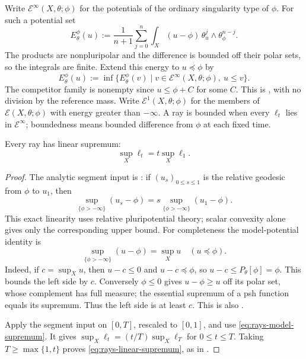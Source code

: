 \begin{definition}
\label{def:rays-relative-energy}
Write $\mathcal E^\infty(X,\theta;\phi)$ for the potentials of
the ordinary singularity type of $\phi$.  For such a potential set
\[
 E_\theta^\phi(u)
 :=\frac1{n+1}\sum_{j=0}^n
       \int_X(u-\phi)\,\theta_u^j\wedge\theta_\phi^{n-j}.
\tag{52.3a}\label{eq:rays-relative-energy}
\]
The products are nonpluripolar and the difference is bounded off their
polar sets, so the integrals are finite.  Extend this energy to
$u\preceq\phi$ by
\[
 E_\theta^\phi(u)
 :=\inf\{E_\theta^\phi(v)\mid v\in\mathcal E^\infty(X,\theta;\phi),\ u\leq v\}.
\]
The competitor family is nonempty since $u\leq\phi+C$ for some $C$.
This is \cite[Definition~3.1.6]{XiaBook}, with no division by the
reference mass.  Write $\mathcal E^1(X,\theta;\phi)$ for the members
of $\mathcal E(X,\theta;\phi)$ with energy greater than $-\infty$.
A ray is bounded when every $\ell_t$ lies in $\mathcal E^\infty$;
boundedness means bounded difference from $\phi$ at each fixed time.
\end{definition}

\begin{lemma}\label{lem:rays-linear-supremum}
Every ray has linear supremum:
\[
                    \sup_X\ell_t=t\sup_X\ell_1.
\tag{52.4}\label{eq:rays-linear-supremum}
\]
\end{lemma}

\begin{proof}
The analytic segment input is \cite[Proposition~4.2.2]{XiaBook}:
if $(u_s)_{0\leq s\leq1}$ is the relative geodesic from $\phi$ to $u_1$,
then
\[
 \sup_{\{\phi>-\infty\}}(u_s-\phi)
 =s\sup_{\{\phi>-\infty\}}(u_1-\phi).
\]
This exact linearity uses relative pluripotential theory; scalar
convexity alone gives only the corresponding upper bound.
For completeness the model-potential identity is
\[
 \sup_{\{\phi>-\infty\}}(u-\phi)=\sup_Xu
\quad(u\preceq\phi).
\tag{52.5}\label{eq:rays-model-supremum}
\]
Indeed, if $c=\sup_Xu$, then $u-c\leq0$ and $u-c\preceq\phi$, so
$u-c\leq P_\theta[\phi]=\phi$.  This bounds the left side by $c$.
Conversely $\phi\leq0$ gives $u-\phi\geq u$ off its polar set,
whose complement has full measure; the essential supremum of a psh
function equals its supremum.  Thus the left side is at least $c$.
This is also \cite[Proposition~3.1.4]{XiaBook}.

Apply the segment input on $[0,T]$, rescaled to $[0,1]$, and use
\eqref{eq:rays-model-supremum}.  It gives
$\sup_X\ell_t=(t/T)\sup_X\ell_T$ for $0\leq t\leq T$.
Taking $T\geq\max\{1,t\}$ proves \eqref{eq:rays-linear-supremum},
as in \cite[Proposition~4.2.4]{XiaBook}.
\end{proof}

